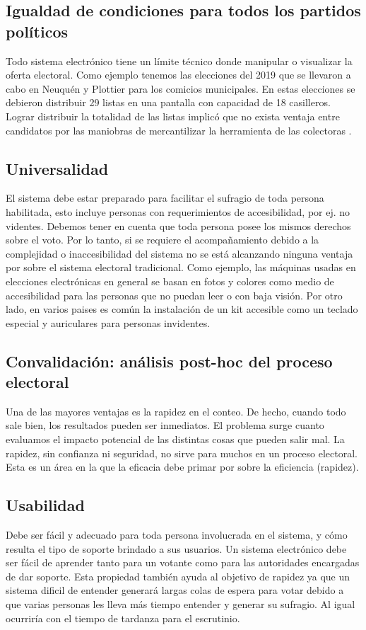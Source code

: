 \subsection{Igualdad de condiciones para todos los partidos políticos}
Todo sistema electrónico tiene un límite técnico donde manipular o visualizar la oferta electoral. Como ejemplo tenemos las elecciones del 2019 que se llevaron a cabo en Neuquén y Plottier para los comicios municipales. En estas elecciones se debieron distribuir 29 listas en una pantalla con capacidad de 18 casilleros. Lograr distribuir la totalidad de las listas implicó que no exista ventaja entre candidatos por las maniobras de mercantilizar la herramienta de las colectoras \cite{limiteColectoras}.

\subsection{Universalidad}
El sistema debe estar preparado para facilitar el sufragio de toda persona habilitada, esto incluye personas con requerimientos de accesibilidad, por ej. no videntes. Debemos tener en cuenta que toda persona posee los mismos derechos sobre el voto. Por lo tanto, si se requiere el acompañamiento debido a la complejidad o inaccesibilidad del sistema no se está alcanzando ninguna ventaja por sobre el sistema electoral tradicional.\newline
Como ejemplo, las máquinas usadas en elecciones electrónicas en general se basan en fotos y colores como medio de accesibilidad para las personas que no puedan leer o con baja visión. Por otro lado, en varios paises es común la instalación de un kit accesible como un teclado especial y auriculares para personas invidentes.

\subsection{Convalidación: análisis post-hoc del proceso electoral}
Una de las mayores ventajas es la rapidez en el conteo. De hecho, cuando todo sale bien, los resultados pueden ser inmediatos. El problema surge cuanto evaluamos el impacto potencial de las distintas cosas que pueden salir mal.\newline
La rapidez, sin confianza ni seguridad, no sirve para muchos en un proceso electoral. Esta es un área en la que la eficacia debe primar por sobre la eficiencia (rapidez).

\subsection{Usabilidad}
Debe ser fácil y adecuado para toda persona involucrada en el sistema, y cómo resulta el tipo de soporte brindado a sus usuarios. Un sistema electrónico debe ser fácil de aprender tanto para un votante como para las autoridades encargadas de dar soporte. Esta propiedad también ayuda al objetivo de rapidez ya que un sistema dificil de entender generará largas colas de espera para votar debido a que varias personas les lleva más tiempo entender y generar su sufragio. Al igual ocurriría con el tiempo de tardanza para el escrutinio.

